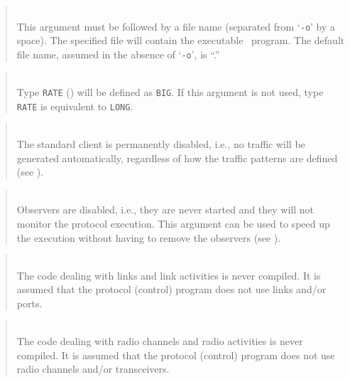 \begin{quote}
\noindent{}\\ \hspace{0in}
This argument must be followed by a file name (separated from `{\tt -o}' by
a space).
The specified file will contain the executable \smurph\ program.
The default file name, assumed in the absence of `{\tt -o}',
is ``\smurphtts.''
\end{quote}

\begin{quote}
\noindent{}\\ \hspace{0in}
Type {\tt RATE} () will be defined as {\tt BIG}.
If this argument is not used, type {\tt RATE} is equivalent to {\tt LONG}.
\end{quote}

\begin{quote}
\noindent{}\\ \hspace{0in}
The standard client is permanently disabled, i.e., no traffic will be
generated automatically, regardless of how the traffic patterns are
defined (see ).
\end{quote}

\begin{quote}
\noindent{}\\ \hspace{0in}
Observers are disabled, i.e., they are never started and they will not
monitor the protocol execution.
This argument can be used to speed up the execution without having
to remove the observers (see ).
\end{quote}

\begin{quote}
\noindent{}\\ \hspace{0in}
The code dealing with links and link activities
is never compiled. It is assumed that the protocol (control) program
does not use links and/or ports.
\end{quote}

\begin{quote}
\noindent{}\\ \hspace{0in}
The code dealing with radio channels and radio activities
is never compiled. It is assumed that the protocol (control) program
does not use radio channels and/or transceivers.
\end{quote}

